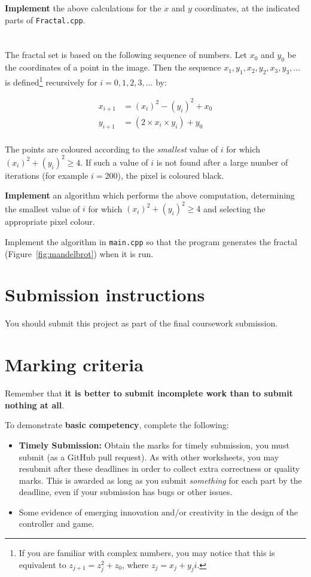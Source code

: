 \documentclass{../../../../fal_assignment}
\begin{document}
\textbf{Implement} the above calculations for the $x$ and $y$ coordinates, at the indicated parts of \texttt{Fractal.cpp}.

\section{} \label{core-c-last}

The fractal set is based on the following sequence of numbers. Let $x_0$ and $y_0$ be the coordinates of a point in the image.
Then the sequence $x_1, y_1, x_2, y_2, x_3, y_3, \dots$ is defined\footnote{%
	If you are familiar with complex numbers, you may notice that this is equivalent to $z_{j+1} = z_j^2 + z_0$, where $z_j = x_j + y_j i$.
} recursively for $i = 0, 1, 2, 3, \dots$ by:

\begin{align*}
x_{i+1} &= (x_i)^2 - (y_i)^2 + x_0 \\
y_{i+1} &= (2 \times x_i \times y_i) + y_0 \\
\end{align*}

The points are coloured according to the \emph{smallest} value of $i$ for which $(x_i)^2 + (y_i)^2 \geq 4$.
If such a value of $i$ is not found after a large number of iterations (for example $i=200$), the pixel is coloured black.

\textbf{Implement} an algorithm which performs the above computation, determining the smallest value of $i$
for which $(x_i)^2 + (y_i)^2 \geq 4$ and selecting the appropriate pixel colour.

Implement the algorithm in \texttt{main.cpp} so that the program generates the fractal (Figure~\ref{fig:mandelbrot}) when it is run.

\section*{Submission instructions}

You should submit this project as part of the final coursework submission.
	
\section*{Marking criteria}
	
	Remember that \textbf{it is better to submit incomplete work than to submit nothing at all}. 
	
	To demonstrate \textbf{basic competency}, complete the following:
	\begin{itemize}
		\item \textbf{Timely Submission:} Obtain the marks for timely submission, you must submit (as a GitHub pull request).
		As with other worksheets, you may resubmit after these deadlines in order to collect extra correctness or quality marks.
		This is awarded as long as you submit \emph{something} for each part by the deadline,
		even if your submission has bugs or other issues.
		\item Some evidence of emerging innovation and/or creativity in the design of the controller and game.
	\end{itemize} 
	
\end{document}
